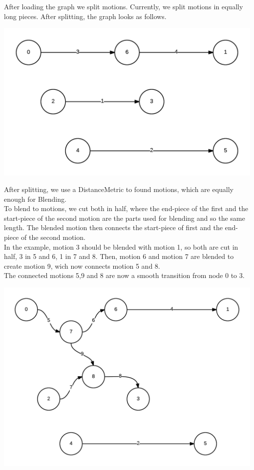 \documentclass[a4paper,10pt]{scrartcl}
\begin{document}
After loading the graph we split motions. Currently, we split motions in equally long pieces.
After splitting, the graph looks as follows.

\includegraphics[width=\textwidth/2]{img/2_GraphAfterSplit.png}


After splitting, we use a DistanceMetric to found motions, which are equally enough for Blending.
\\
To blend to motions, we cut both in half, where the end-piece of the first and the start-piece of the second motion are the parts used for blending and so the same length. The blended motion then connects the start-piece of first and the end-piece of the second motion.
\\
In the example, motion 3 should be blended with motion 1, so both are cut in half, 3 in 5 and 6, 1 in 7 and 8. Then, motion 6 and motion 7 are blended to create motion 9, wich now connects motion 5 and 8.
\\
The connected motions 5,9 and 8 are now a smooth transition from node 0 to 3.
 
\includegraphics[width=\textwidth/2]{img/3_GraphAfterBlend_0+1.png}
\end{document}
